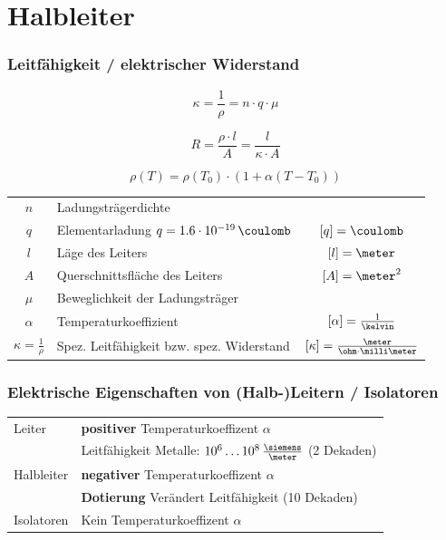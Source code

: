 \section{Halbleiter}

\subsubsection{Leitfähigkeit / elektrischer Widerstand}

\begin{minipage}[t]{0.48\columnwidth}
	$$ \boxed{ \kappa = \frac{1}{\rho} = n \cdot q \cdot \mu } $$
\end{minipage}
\hfill
\begin{minipage}[t]{0.48\columnwidth}
	$$ \boxed{ R = \frac{\rho \cdot l}{A} = \frac{l}{ \kappa \cdot A} } $$
\end{minipage}

\vspace{0.2cm}

$$ \boxed{ \rho(T) = \rho(T_0) \cdot (1  + \alpha(T - T_0)) } $$


\begin{tabular}{clc}
	$n$ 						& Ladungsträgerdichte 									& 												\\
	$q$ 						& Elementarladung $q = 1.6 \cdot 10^{-19} \, \coulomb$ 	& $[q] = \coulomb$								\\
	$l$ 						& Läge des Leiters 										& $[l] = \meter$ 								\\
	$A$ 						& Querschnittsfläche des Leiters 						& $[A] = \meter^2$ 								\\
	$\mu$ 						& Beweglichkeit der Ladungsträger 						& 												\\
	$\alpha$ 					& Temperaturkoeffizient 								& $[\alpha] = \frac{1}{\kelvin}$ 				\\
	$\kappa = \frac{1}{\rho}$ 	& Spez. Leitfähigkeit bzw. spez. Widerstand 			& $[\kappa] = \frac{\meter}{\ohm \cdot \milli \meter}$
\end{tabular}


\subsubsection{Elektrische Eigenschaften von (Halb-)Leitern / Isolatoren}

\begin{tabular}{ll}
	Leiter 		& \textbf{positiver} Temperaturkoeffizent $\alpha$ 									\\
				& Leitfähigkeit Metalle: $10^6 \ldots 10^8 \, \frac{\siemens}{\meter}$ (2 Dekaden) 	\\
	Halbleiter 	& \textbf{negativer} Temperaturkoeffizent $\alpha$ 									\\
				& \textbf{Dotierung} Verändert Leitfähigkeit (10 Dekaden) 							\\
	Isolatoren 	& Kein Temperaturkoeffizent $\alpha$ 
\end{tabular}


